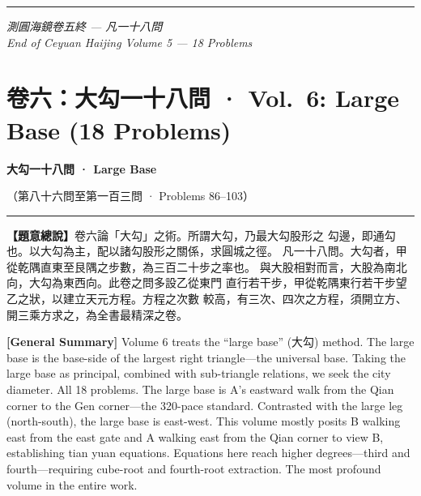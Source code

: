 \documentclass[9pt,a4paper]{article}
\newcommand{\longline}{\noindent\rule{\textwidth}{0.4pt}}
\begin{document}
\vspace{0.4cm}
\longline
\begin{center}
\textit{測圓海鏡卷五終 --- 凡一十八問}\\[0.2cm]
\textit{End of Ceyuan Haijing Volume 5 --- 18 Problems}
\end{center}

\newpage

\section{卷六：大勾一十八問 · Vol.\ 6: Large Base (18 Problems)}
\label{sec:vol6}

\begin{center}
{\Large\bfseries\color{volcolor} 大勾一十八問 · Large Base}

\vspace{0.2cm}

{\small\color{notecolor} （第八十六問至第一百三問 · Problems 86--103）}
\end{center}

\vspace{0.2cm}
\longline
\vspace{0.2cm}

\noindent\begin{minipage}[t]{0.48\textwidth}
\noindent
\textbf{【題意總說】}卷六論「大勾」之術。所謂大勾，乃最大勾股形之
勾邊，即通勾也。以大勾為主，配以諸勾股形之關係，求圓城之徑。
凡一十八問。大勾者，甲從乾隅直東至艮隅之步數，為三百二十步之率也。
與大股相對而言，大股為南北向，大勾為東西向。此卷之問多設乙從東門
直行若干步，甲從乾隅東行若干步望乙之狀，以建立天元方程。方程之次數
較高，有三次、四次之方程，須開立方、開三乘方求之，為全書最精深之卷。
\end{minipage}%
\hfill%
\begin{minipage}[t]{0.50\textwidth}
\noindent
\textbf{[General Summary]} Volume 6 treats the ``large base'' (大勾) method.
The large base is the base-side of the largest right triangle---the universal
base. Taking the large base as principal, combined with sub-triangle relations,
we seek the city diameter. All 18 problems. The large base is A's eastward walk
from the Qian corner to the Gen corner---the 320-pace standard. Contrasted
with the large leg (north-south), the large base is east-west. This volume
mostly posits B walking east from the east gate and A walking east from the
Qian corner to view B, establishing tian yuan equations. Equations here reach
higher degrees---third and fourth---requiring cube-root and fourth-root
extraction. The most profound volume in the entire work.
\end{minipage}
\vspace{0.15cm}
\end{document}
